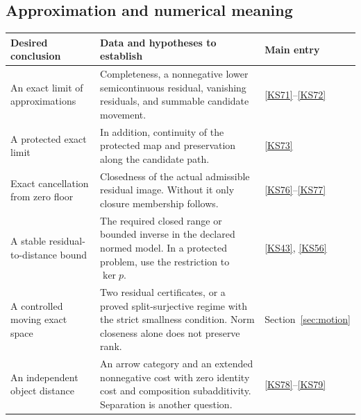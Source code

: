 \subsection{Approximation and numerical meaning}
\begin{longtable}{@{}p{.24\linewidth}p{.48\linewidth}p{.21\linewidth}@{}}
\toprule Desired conclusion & Data and hypotheses to establish & Main entry\\\midrule\endhead
An exact limit of approximations & Completeness, a nonnegative lower semicontinuous residual, vanishing residuals, and summable candidate movement. & \ref{KS71}--\ref{KS72}\\[4pt]
A protected exact limit & In addition, continuity of the protected map and preservation along the candidate path. & \ref{KS73}\\[4pt]
Exact cancellation from zero floor & Closedness of the actual admissible residual image. Without it only closure membership follows. & \ref{KS76}--\ref{KS77}\\[4pt]
A stable residual-to-distance bound & The required closed range or bounded inverse in the declared normed model. In a protected problem, use the restriction to $\ker p$. & \ref{KS43}, \ref{KS56}\\[4pt]
A controlled moving exact space & Two residual certificates, or a proved split-surjective regime with the strict smallness condition. Norm closeness alone does not preserve rank. & Section~\ref{sec:motion}\\[4pt]
An independent object distance & An arrow category and an extended nonnegative cost with zero identity cost and composition subadditivity. Separation is another question. & \ref{KS78}--\ref{KS79}\\
\bottomrule
\end{longtable}

